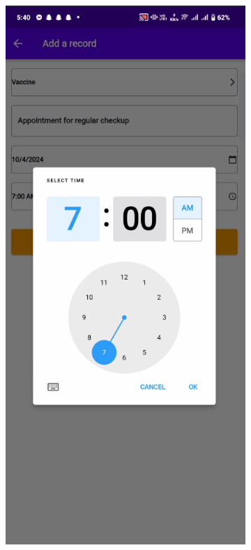 \begin{figure}[H]
\begin{subfigure}{0.32\textwidth}
    \label{subfig:6}
  \end{subfigure}
  \hfill
  \begin{subfigure}{0.32\textwidth}
    \includegraphics[width=\linewidth]{img/s2.png}

\end{subfigure}
\end{figure}
